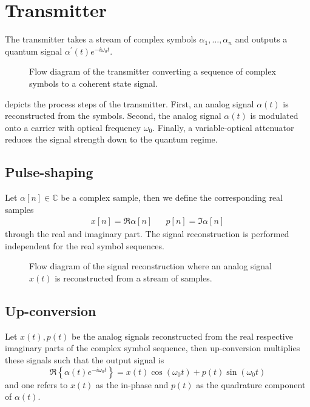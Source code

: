 \section{Transmitter}


The transmitter takes a stream of complex symbols $\alpha_1,\dots,\alpha_n$ and outputs a quantum signal $\alpha^\prime(t)e^{-i\omega_0t}$.

\begin{figure}[htb]
	\centering
	
	\caption{Flow diagram of the transmitter converting a sequence of complex symbols to a coherent state signal.}\label{fig:transmitter}
\end{figure}
 depicts the process steps of the transmitter.
First, an analog signal $\alpha(t)$ is reconstructed from the symbols.
Second, the analog signal $\alpha(t)$ is modulated onto a carrier with optical frequency $\omega_0$.
Finally, a variable-optical attenuator reduces the signal strength down to the quantum regime.

\subsection{Pulse-shaping}

Let $\alpha[n]\in\mathbb{C}$ be a complex sample, then we define the corresponding real samples
\begin{align}
	x[n]=\Re{\alpha[n]}
	&&
	p[n]=\Im{\alpha[n]}
\end{align}
through the real and imaginary part.
The signal reconstruction is performed independent for the real symbol sequences.
\begin{figure}[htb]
	\centering
	
	\caption{Flow diagram of the signal reconstruction where an analog signal $x(t)$ is reconstructed from a stream of samples.}\label{fig:transmitter}
\end{figure}


\subsection{Up-conversion}

Let $x(t),p(t)$ be the analog signals reconstructed from the real respective imaginary parts of the complex symbol sequence, then up-conversion multiplies these signals such that the output signal is~\cite[p.~25]{Madhow2008}
\begin{equation}
	\Re\left\{
		\alpha(t)
		e^{-i\omega_0t}
	\right\}
	=
	x(t)
	\cos(\omega_0t)
	+
	p(t)
	\sin(\omega_0t)
\end{equation}
and one refers to $x(t)$ as the in-phase and $p(t)$ as the quadrature component of $\alpha(t)$.

